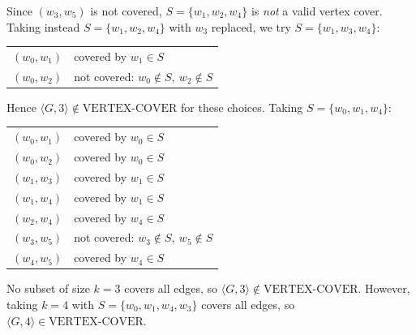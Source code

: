 \documentclass[12pt,a4paper,openany]{article}
\begin{document}
Since $(w_3, w_5)$ is not covered, $S = \{w_1, w_2, w_4\}$ is \emph{not} a valid vertex cover. Taking instead $S = \{w_1, w_2, w_4\}$ with $w_3$ replaced, we try $S = \{w_1, w_3, w_4\}$:

\begin{center}
\begin{tabular}{ll}
$(w_0, w_1)$ & covered by $w_1 \in S$ \\
$(w_0, w_2)$ & not covered: $w_0 \notin S,\ w_2 \notin S$ \\
\end{tabular}
\end{center}

Hence $\langle G, 3 \rangle \notin \text{VERTEX-COVER}$ for these choices. Taking $S = \{w_0, w_1, w_4\}$:

\begin{center}
\begin{tabular}{ll}
$(w_0, w_1)$ & covered by $w_0 \in S$ \\
$(w_0, w_2)$ & covered by $w_0 \in S$ \\
$(w_1, w_3)$ & covered by $w_1 \in S$ \\
$(w_1, w_4)$ & covered by $w_1 \in S$ \\
$(w_2, w_4)$ & covered by $w_4 \in S$ \\
$(w_3, w_5)$ & not covered: $w_3 \notin S,\ w_5 \notin S$ \\
$(w_4, w_5)$ & covered by $w_4 \in S$ \\
\end{tabular}
\end{center}

No subset of size $k = 3$ covers all edges, so $\langle G, 3 \rangle \notin \text{VERTEX-COVER}$. However, taking $k = 4$ with $S = \{w_0, w_1, w_4, w_3\}$ covers all edges, so $\langle G, 4 \rangle \in \text{VERTEX-COVER}$.

\begin{center}
\end{center}
\end{document}
